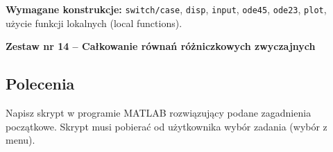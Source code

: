 \documentclass[a4paper,11pt]{article}
\begin{document}
\vspace{0.3cm}
\begin{ramka}
\textbf{Wymagane konstrukcje:}
\texttt{switch/case}, \texttt{disp}, \texttt{input}, \texttt{ode45}, \texttt{ode23}, \texttt{plot}, użycie funkcji lokalnych (local functions).
\end{ramka}

\clearpage
\begin{center}
  {\large\bfseries Zestaw nr 14 \quad -- \quad Całkowanie równań różniczkowych zwyczajnych}
\end{center}
\hrulefill
\vspace{0.4cm}

\subsection*{Polecenia}

Napisz skrypt w programie MATLAB rozwiązujący podane zagadnienia początkowe. Skrypt musi pobierać od użytkownika wybór zadania (wybór z menu).
\end{document}
